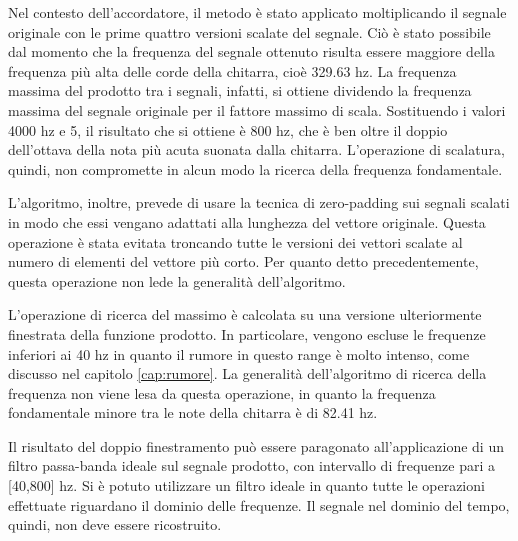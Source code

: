 	Nel contesto dell'accordatore, il metodo è stato applicato moltiplicando il segnale originale con le prime quattro versioni scalate del segnale.
	Ciò è stato possibile dal momento che la frequenza del segnale ottenuto risulta essere maggiore della frequenza più alta delle corde della chitarra, cioè 329.63 hz.
	La frequenza massima del prodotto tra i segnali, infatti, si ottiene dividendo la frequenza massima del segnale originale per il fattore massimo di scala.
	Sostituendo i valori 4000 hz e 5, il risultato che si ottiene è 800 hz, che è ben oltre il doppio dell'ottava della nota più acuta suonata dalla chitarra. L'operazione di scalatura, quindi, non compromette in alcun modo la ricerca della frequenza fondamentale.

	L'algoritmo, inoltre, prevede di usare la tecnica di zero-padding sui segnali scalati in modo che essi vengano adattati alla lunghezza del vettore originale. 
	Questa operazione è stata evitata troncando tutte le versioni dei vettori scalate al numero di elementi del vettore più corto.
	Per quanto detto precedentemente, questa operazione non lede la generalità dell'algoritmo.

	L'operazione di ricerca del massimo è calcolata su una versione ulteriormente finestrata della funzione prodotto. 
	In particolare, vengono escluse le frequenze inferiori ai 40 hz in quanto il rumore in questo range è molto intenso, come discusso nel capitolo \ref{cap:rumore}.
	La generalità dell'algoritmo di ricerca della frequenza non viene lesa da questa operazione, in quanto la frequenza fondamentale minore tra le note della chitarra è di 82.41 hz.

	Il risultato del doppio finestramento può essere paragonato all'applicazione di un filtro passa-banda ideale sul segnale prodotto, con intervallo di frequenze pari a [40,800] hz.
	Si è potuto utilizzare un filtro ideale in quanto tutte le operazioni effettuate riguardano il dominio delle frequenze.
	Il segnale nel dominio del tempo, quindi, non deve essere ricostruito.





